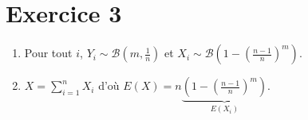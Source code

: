 \part{Exercice 3}

\begin{enumerate}
	\item Pour tout $i$, $Y_i \sim \textstyle \mathcal{B}\left(m, \frac{1}{n}\right)$ et $X_i \sim \mathcal{B}\left(1-\left( \frac{n-1}{n}\right)^m\right)$.
	\item $X = \sum_{i=1}^n X_i$ d'où $E(X) = n \underbrace{\left( 1-\left( \frac{n-1}{n} \right)^m \right)}_{E(X_i)}$.
\end{enumerate}

